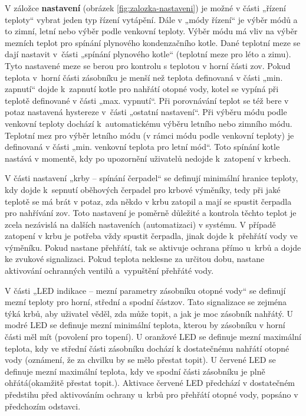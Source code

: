 V záložce \textbf{nastavení} (obrázek \ref{fig:zalozka-nastaveni}) je možné v části „řízení teploty“ vybrat jeden typ řízení vytápění. Dále v „módy řízení“ je výběr módů a to zimní, letní nebo výběr podle venkovní teploty. Výběr módu má vliv na výběr mezních teplot pro spínání plynového kondenzačního kotle. Dané teplotní meze se dají nastavit v~části „spínání plynového kotle“ (teplotní meze pro léto a zimu). Tyto nastavené meze se berou pro kontrolu s teplotou v horní části \acrshort{zov}. Pokud teplota v~horní části zásobníku je menší než teplota definovaná v části „min. zapnutí“ dojde k~zapnutí kotle pro nahřátí otopné vody, kotel se vypíná při teplotě definované v části „max. vypnutí“. Při porovnávání teplot se též bere v potaz nastavená hystereze v~části „ostatní nastavení“. Při výběru módu podle venkovní teploty dochází k~automatickému výběru letního nebo zimního módu. Teplotní mez pro výběr letního módu (v rámci módu podle venkovní teploty) je definovaná v části „min. venkovní teplota pro letní mód“. Toto spínání kotle nastává v momentě, kdy po upozornění uživatelů nedojde k~zatopení v krbech.


V části nastavení „krby – spínání čerpadel“ se definují minimální hranice teploty, kdy dojde k~sepnutí oběhových čerpadel pro krbové výměníky, tedy při jaké teplotě se má brát v potaz, zda někdo v krbu zatopil a mají se spustit čerpadla pro nahřívání \acrshort{zov}. Toto nastavení je poměrně důležité a kontrola těchto teplot je zcela nezávislá na dalších nastaveních (automatizaci) v systému. V případě zatopení v krbu je potřeba vždy spustit čerpadla, jinak dojde k~přehřátí vody ve výměníku. Pokud nastane přehřátí, tak se aktivuje ochrana přímo u~krbů a dojde ke zvukové signalizaci. Pokud teplota neklesne za určitou dobu, nastane aktivování ochranných ventilů a~vypuštění přehřáté vody.


V části „LED indikace – mezní parametry zásobníku otopné vody“ se definují mezní teploty pro horní, střední a spodní část\acrshort{zov}. Tato signalizace se zejména týká krbů, aby uživatel věděl, zda může topit, a jak je moc zásobník nahřátý. U modré LED se definuje mezní minimální teplota, kterou by zásobníku v horní části měl mít (povolení pro topení). U oranžové LED se definuje mezní maximální teplota, kdy ve střední části zásobníku dochází k dostatečnému nahřátí otopné vody (oznámení, že za chvilku by se mělo přestat topit). U červené LED se definuje mezní maximální teplota, kdy ve spodní části zásobníku je plně ohřátá(okamžitě přestat topit.). Aktivace červené LED předchází v dostatečném předstihu před aktivováním ochrany u~krbů pro přehřátí otopné vody, popsáno v předchozím odstavci.

